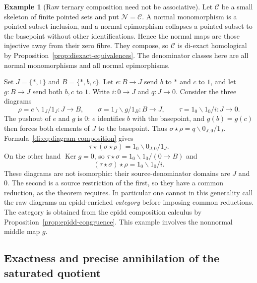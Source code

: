 \documentclass[11pt,reqno,a4paper]{amsart}
\theoremstyle{definition}
\newtheorem{example}[theorem]{Example}
\theoremstyle{remark}
\newcommand{\C}{\mathcal{C}}
\newcommand{\N}{\mathcal{N}}
\newcommand{\0}{\mathbf{0}}
\renewcommand{\1}{\mathbf{1}}
\DeclareMathOperator{\Ker}{Ker}
\begin{document}
\begin{example}[Raw ternary composition need not be associative]\label{di:ex:raw-associativity}
Let $\C$ be a small skeleton of finite pointed sets and put $\N=\C$.
A normal monomorphism is a pointed subset inclusion, and a normal
epimorphism collapses a pointed subset to the basepoint without other
identifications. Hence the normal maps are those injective away from
their zero fibre. They compose, so $\C$ is di-exact homological by
Proposition~\ref{prop:diexact-equivalences}. The denominator classes
here are all normal monomorphisms and all normal epimorphisms.

Set $J=\{*,1\}$ and $B=\{*,b,c\}$. Let $e:B\to J$ send $b$ to
$*$ and $c$ to $1$, and let $g:B\to J$ send both $b,c$ to $1$.
Write $i:0\to J$ and $q:J\to0$. Consider the three diagrams
\[
 \rho=e\backslash1_J/1_J:J\to B,\qquad
 \sigma=1_J\backslash g/1_B:B\to J,\qquad
 \tau=1_0\backslash1_0/i:J\to0.
\]
The pushout of $e$ and $g$ is $0$: $e$ identifies $b$ with the
basepoint, and $g(b)=g(c)$ then forces both elements of $J$ to the
basepoint. Thus
$\sigma\star\rho=q\backslash0_{J,0}/1_J$.
Formula~\eqref{di:eq:diagram-composition} gives
\[
 \tau\star(\sigma\star\rho)
       =1_0\backslash0_{J,0}/1_J.
\]
On the other hand $\Ker g=0$, so
$\tau\star\sigma=1_0\backslash1_0/(0\to B)$ and
\[
 (\tau\star\sigma)\star\rho
       =1_0\backslash1_0/i.
\]
These diagrams are not isomorphic: their source-denominator domains
are $J$ and $0$. The second is a source restriction of the first,
so they have a common reduction, as the theorem requires. In
particular one cannot in this generality call the raw diagrams an
epidd-enriched \emph{category} before imposing common reductions.
The category is obtained from the epidd composition calculus by
Proposition~\ref{prop:epidd-congruence}. This example involves the
nonnormal middle map $g$.
\end{example}

\subsection{Exactness and precise annihilation of the saturated quotient}\label{di:sec:quotient}
\end{document}
